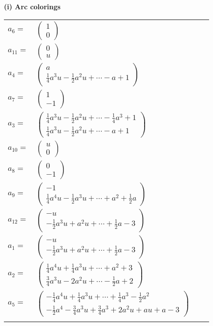 \documentclass[1p]{elsarticle_modified}
\theoremstyle{definition}
\begin{document}
\flushleft \textbf{(i) Arc colorings}\\
\begin{tabular}{m{7pt} m{180pt} m{7pt} m{180pt} }
\flushright $a_{6}=$&$\begin{pmatrix}1\\0\end{pmatrix}$ \\
\flushright $a_{11}=$&$\begin{pmatrix}0\\u\end{pmatrix}$ \\
\flushright $a_{4}=$&$\begin{pmatrix}a\\\frac{1}{4} a^3 u-\frac{1}{2} a^2 u+\cdots- a+1\end{pmatrix}$ \\
\flushright $a_{7}=$&$\begin{pmatrix}1\\-1\end{pmatrix}$ \\
\flushright $a_{3}=$&$\begin{pmatrix}\frac{1}{4} a^3 u-\frac{1}{2} a^2 u+\cdots-\frac{1}{4} a^3+1\\\frac{1}{4} a^3 u-\frac{1}{2} a^2 u+\cdots- a+1\end{pmatrix}$ \\
\flushright $a_{10}=$&$\begin{pmatrix}u\\0\end{pmatrix}$ \\
\flushright $a_{8}=$&$\begin{pmatrix}0\\-1\end{pmatrix}$ \\
\flushright $a_{9}=$&$\begin{pmatrix}-1\\\frac{1}{4} a^4 u-\frac{1}{2} a^3 u+\cdots+a^2+\frac{1}{2} a\end{pmatrix}$ \\
\flushright $a_{12}=$&$\begin{pmatrix}- u\\-\frac{1}{2} a^3 u+a^2 u+\cdots+\frac{1}{2} a-3\end{pmatrix}$ \\
\flushright $a_{1}=$&$\begin{pmatrix}- u\\-\frac{1}{2} a^3 u+a^2 u+\cdots+\frac{1}{2} a-3\end{pmatrix}$ \\
\flushright $a_{2}=$&$\begin{pmatrix}\frac{1}{4} a^4 u+\frac{1}{4} a^3 u+\cdots+a^2+3\\\frac{3}{4} a^3 u-2 a^2 u+\cdots-\frac{1}{2} a+2\end{pmatrix}$ \\
\flushright $a_{5}=$&$\begin{pmatrix}-\frac{1}{4} a^4 u+\frac{1}{4} a^3 u+\cdots+\frac{1}{4} a^3-\frac{1}{2} a^2\\-\frac{1}{2} a^4-\frac{3}{4} a^3 u+\frac{3}{4} a^3+2 a^2 u+a u+a-3\end{pmatrix}$\\&\end{tabular}
\end{document}
